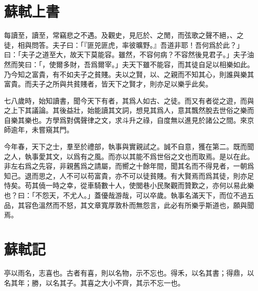 \section[上梅直講書\quad{\small 蘇軾}]{{\normalsize 蘇軾}\quad 上書}
每讀至，讀至，常竊悲之不遇。及觀史，見厄於、之閒，而弦歌之聲不絕，、之徒，相與問答。夫子曰：「『匪兕匪虎，率彼曠野。』吾道非耶！吾何爲於此？」曰：「夫子之道至大，故天下莫能容。雖然，不容何病？不容然後見君子。」夫子油然而笑曰：「，使爾多財，吾爲爾宰。」夫天下雖不能容，而其徒自足以相樂如此。乃今知之富貴，有不如夫子之貧賤。夫以之賢，以、之親而不知其心，則誰與樂其富貴。而夫子之所與共貧賤者，皆天下之賢才，則亦足以樂乎此矣。

七八歲時，始知讀書，聞今天下有者，其爲人如古、之徒。而又有者從之遊，而與之上下其議論。其後益壯，始能讀其文詞，想見其爲人，意其飄然脫去世俗之樂而自樂其樂也。方學爲對偶聲律之文，求{斗升}之祿，自度無以進見於諸公之間。來京師逾年，未嘗窺其門。%

今年春，天下之士，羣至於禮部，執事與實親試之。{誠}不自意，獲在第二。既而聞之{人}，執事愛其文，以爲有之風。而亦以其能不爲世俗之文也而取{焉}。是以在此。非左右爲之先容，非親舊爲之請屬，而嚮之十餘年間，聞其名而不得見者，一朝爲知己。退而思之，人不可以苟富貴，亦不可以徒貧賤。有大賢焉而爲其徒，則亦足恃矣。苟其僥一時之幸，從車騎數十人，使閭巷小民聚觀而贊歎之，亦何以易此樂也？曰：「不怨天，不尤人。」蓋優哉游哉，可以卒歲。執事名滿天下，而位不過五品，其容色溫然而不怒，其文章寬厚敦朴而無怨言，此必有所樂乎斯道也，願與聞焉。%

\theendnotes

\section[喜雨亭記\quad{\small 蘇軾}]{{\normalsize 蘇軾}\quad {}記}
亭以雨名，志喜也。古者有喜，則以名物，示不忘也。得禾，以名其書；得鼎，以名其年；勝，以名其子。其喜之大小不齊，其示不忘一也。%

